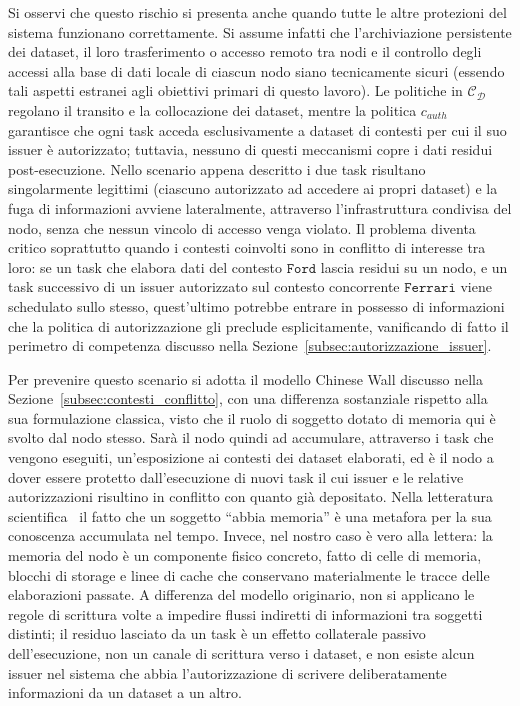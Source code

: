 Si osservi che questo rischio si presenta anche quando tutte le altre protezioni del sistema funzionano correttamente. Si assume infatti che l'archiviazione persistente dei dataset, il loro trasferimento o accesso remoto tra nodi e il controllo degli accessi alla base di dati locale di ciascun nodo siano tecnicamente sicuri (essendo tali aspetti estranei agli obiettivi primari di questo lavoro). Le politiche in $\mathcal{C_D}$ regolano il transito e la collocazione dei dataset, mentre la politica $c_{auth}$ garantisce che ogni task acceda esclusivamente a dataset di contesti per cui il suo issuer è autorizzato; tuttavia, nessuno di questi meccanismi copre i dati residui post-esecuzione. Nello scenario appena descritto i due task risultano singolarmente legittimi (ciascuno autorizzato ad accedere ai propri dataset) e la fuga di informazioni avviene lateralmente, attraverso l'infrastruttura condivisa del nodo, senza che nessun vincolo di accesso venga violato. Il problema diventa critico soprattutto quando i contesti coinvolti sono in conflitto di interesse tra loro: se un task che elabora dati del contesto $\mathtt{Ford}$ lascia residui su un nodo, e un task successivo di un issuer autorizzato sul contesto concorrente $\mathtt{Ferrari}$ viene schedulato sullo stesso, quest'ultimo potrebbe entrare in possesso di informazioni che la politica di autorizzazione gli preclude esplicitamente, vanificando di fatto il perimetro di competenza discusso nella Sezione~\ref{subsec:autorizzazione_issuer}.

Per prevenire questo scenario si adotta il modello Chinese Wall discusso nella Sezione~\ref{subsec:contesti_conflitto}, con una differenza sostanziale rispetto alla sua formulazione classica, visto che il ruolo di soggetto dotato di memoria qui è svolto dal nodo stesso. Sarà il nodo quindi ad accumulare, attraverso i task che vengono eseguiti, un'esposizione ai contesti dei dataset elaborati, ed è il nodo a dover essere protetto dall'esecuzione di nuovi task il cui issuer e le relative autorizzazioni risultino in conflitto con quanto già depositato. Nella letteratura scientifica~\cite{chinese-wall-kessler} il fatto che un soggetto \enquote{abbia memoria} è una metafora per la sua conoscenza accumulata nel tempo. Invece, nel nostro caso è vero alla lettera: la memoria del nodo è un componente fisico concreto, fatto di celle di memoria, blocchi di storage e linee di cache che conservano materialmente le tracce delle elaborazioni passate. A differenza del modello originario, non si applicano le regole di scrittura volte a impedire flussi indiretti di informazioni tra soggetti distinti; il residuo lasciato da un task è un effetto collaterale passivo dell'esecuzione, non un canale di scrittura verso i dataset, e non esiste alcun issuer nel sistema che abbia l'autorizzazione di scrivere deliberatamente informazioni da un dataset a un altro.

